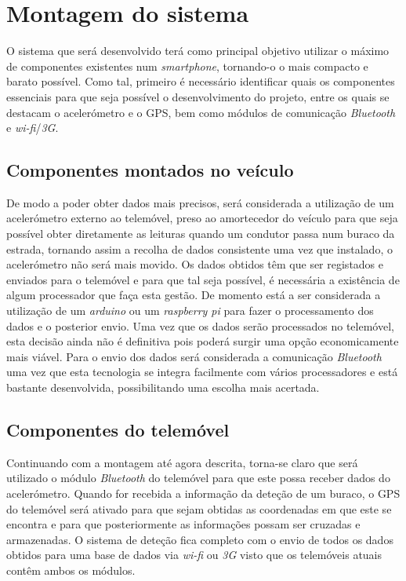 \section{Montagem do sistema}
\label{sec:montagem_do_sistema}

O sistema que será desenvolvido terá como principal objetivo utilizar o máximo de componentes existentes num \emph{smartphone}, tornando-o o mais compacto e barato possível. Como tal, primeiro é necessário identificar quais os componentes essenciais para que seja possível o desenvolvimento do projeto, entre os quais se destacam o acelerómetro e o GPS, bem como módulos de comunicação \emph{Bluetooth} e \emph{wi-fi}/\emph{3G}.

\subsection{Componentes montados no veículo}
\label{subsec: componentes_montados_no_veiculo}

De modo a poder obter dados mais precisos, será considerada a utilização de um acelerómetro externo ao telemóvel, preso ao amortecedor do veículo para que seja possível obter diretamente as leituras quando um condutor passa num buraco da estrada, tornando assim a recolha de dados consistente uma vez que instalado, o acelerómetro não será mais movido. Os dados obtidos têm que ser registados e enviados para o telemóvel e para que tal seja possível, é necessária a existência de algum processador que faça esta gestão. De momento está a ser considerada a utilização de um \emph{arduino} ou um \emph{raspberry pi} para fazer o processamento dos dados e o posterior envio. Uma vez que os dados serão processados no telemóvel, esta decisão ainda não é definitiva pois poderá surgir uma opção economicamente mais viável. Para o envio dos dados será considerada a comunicação \emph{Bluetooth} uma vez que esta tecnologia se integra facilmente com vários processadores e está bastante desenvolvida, possibilitando uma escolha mais acertada.

\subsection{Componentes do telemóvel}
\label{subsec: componentes_do_telemovel}

Continuando com a montagem até agora descrita, torna-se claro que será utilizado o módulo \emph{Bluetooth}	do telemóvel para que este possa receber dados do acelerómetro. Quando for recebida a informação da deteção de um buraco, o GPS do telemóvel será ativado para que sejam obtidas as coordenadas em que este se encontra e para que posteriormente as informações possam ser cruzadas e armazenadas. O sistema de deteção fica completo com o envio de todos os dados obtidos para uma base de dados via \emph{wi-fi} ou \emph{3G} visto que os telemóveis atuais contêm ambos os módulos.


